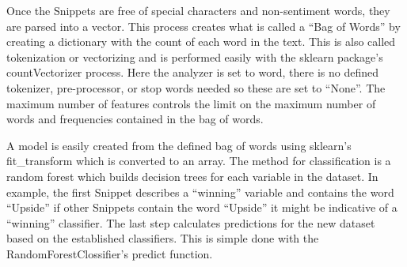 \documentclass[sigconf]{acmart}
\begin{document}
Once the Snippets are free of special characters and non-sentiment words, they are parsed into a vector. This process creates what is called a ``Bag of Words'' by creating a dictionary with the count of each word in the text. This is also called tokenization or vectorizing and is performed easily with the sklearn package's countVectorizer process. Here the analyzer is set to word, there is no defined tokenizer, pre-processor, or stop words needed so these are set to ``None''. The maximum number of features controls the limit on the maximum number of words and frequencies contained in the bag of words. 

A model is easily created from the defined bag of words using sklearn's fit\_transform which is converted to an array. The method for classification is a random forest which builds decision trees for each variable in the dataset. In example, the first Snippet describes a ``winning'' variable and contains the word ``Upside'' if other Snippets contain the word ``Upside'' it might be indicative of a ``winning'' classifier. The last step calculates predictions for the new dataset based on the established classifiers. This is simple done with the RandomForestClossifier's predict function.
\end{document}

